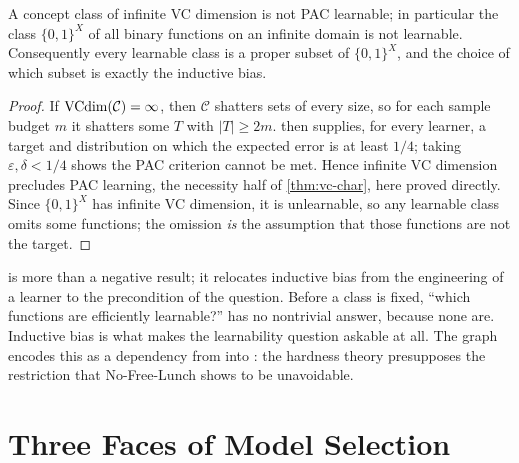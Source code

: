 \begin{cor}
\label{cor:bias-mandatory}
A concept class of infinite VC dimension is not PAC learnable; in particular the class $\{0,1\}^X$ of all binary functions on an infinite domain is not learnable. Consequently every learnable class is a proper subset of $\{0,1\}^X$, and the choice of which subset is exactly the inductive bias.
\end{cor}

\begin{proof}
If $\mathrm{VCdim}(\mathcal{C}) = \infty$, then $\mathcal{C}$ shatters sets of every size, so for each sample budget $m$ it shatters some $T$ with $|T| \geq 2m$.  then supplies, for every learner, a target and distribution on which the expected error is at least $1/4$; taking $\varepsilon, \delta < 1/4$ shows the PAC criterion cannot be met. Hence infinite VC dimension precludes PAC learning, the necessity half of \cref{thm:vc-char}, here proved directly. Since $\{0,1\}^X$ has infinite VC dimension, it is unlearnable, so any learnable class omits some functions; the omission \emph{is} the assumption that those functions are not the target.
\end{proof}

\begin{remark}
\label{rmk:nfl-pl}
 is more than a negative result; it relocates inductive bias from the engineering of a learner to the precondition of the question. Before a class is fixed, ``which functions are efficiently learnable?'' has no nontrivial answer, because none are. Inductive bias is what makes the learnability question askable at all. The graph encodes this as a  dependency from  into : the hardness theory presupposes the restriction that No-Free-Lunch shows to be unavoidable.
\end{remark}


\section{Three Faces of Model Selection}
\label{sec:model-selection}

